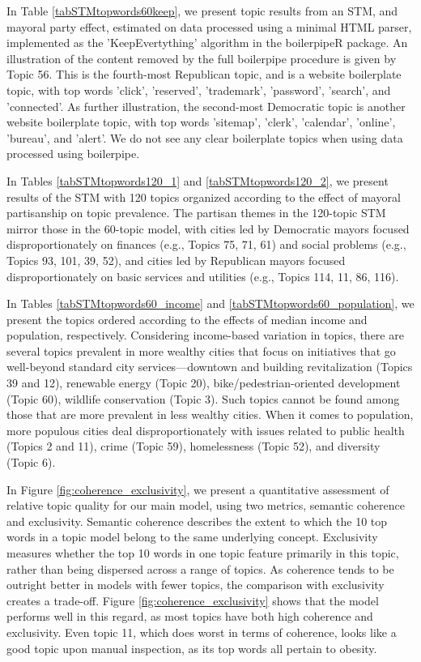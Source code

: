 \documentclass[11pt]{article}
\begin{document}
In Table \ref{tabSTMtopwords60keep}, we present topic results from an STM, and mayoral party effect, estimated on data processed using a minimal HTML parser, implemented as the 'KeepEvertything' algorithm in the boilerpipeR package. An illustration of the content removed by the full boilerpipe procedure is given by Topic 56. This is the fourth-most Republican topic, and is a website boilerplate topic, with top words 'click', 'reserved', 'trademark', 'password', 'search', and 'connected'.  As further illustration, the second-most Democratic topic is another website boilerplate topic, with top words 'sitemap', 'clerk', 'calendar', 'online', 'bureau', and 'alert'. We do not see any clear boilerplate topics when using data processed using boilerpipe.



In Tables \ref{tabSTMtopwords120_1} and \ref{tabSTMtopwords120_2}, we present results of the STM with 120 topics organized according to the effect of mayoral partisanship on topic prevalence. The partisan themes in the 120-topic STM mirror those in the 60-topic model, with cities led by Democratic mayors focused disproportionately on finances (e.g., Topics 75, 71, 61) and social problems (e.g., Topics 93, 101, 39, 52), and cities led by Republican mayors focused disproportionately on basic services and utilities (e.g., Topics 114, 11,  86, 116).





In Tables \ref{tabSTMtopwords60_income} and \ref{tabSTMtopwords60_population}, we present the topics ordered according to the effects of median income and population, respectively. Considering income-based variation in topics, there are several topics prevalent in more wealthy cities that focus on initiatives that go well-beyond standard city services---downtown and building revitalization (Topics 39 and 12), renewable energy (Topic 20), bike/pedestrian-oriented development (Topic 60), wildlife conservation (Topic 3). Such topics cannot be found among those that are more prevalent in less wealthy cities. When it comes to population, more populous cities deal disproportionately with issues related to public health (Topics  2 and 11), crime (Topic 59), homelessness (Topic 52), and diversity (Topic 6).

In Figure \ref{fig:coherence_exclusivity}, we present a quantitative assessment of relative topic quality for our main model, using two metrics, semantic coherence and exclusivity. Semantic coherence \citep{Mimno2011} describes the extent to which the 10 top words in a topic model belong to the same underlying concept. Exclusivity \citep{Bischof2012,Roberts2014} measures whether the top 10 words in one topic feature primarily in this topic, rather than being dispersed across a range of topics. As coherence tends to be outright better in models with fewer topics, the comparison with exclusivity creates a trade-off. Figure \ref{fig:coherence_exclusivity} shows that the model performs well in this regard, as most topics have both high coherence and exclusivity. Even topic 11, which does worst in terms of coherence, looks like a good topic upon manual inspection, as its top words all pertain to obesity.
\end{document}

